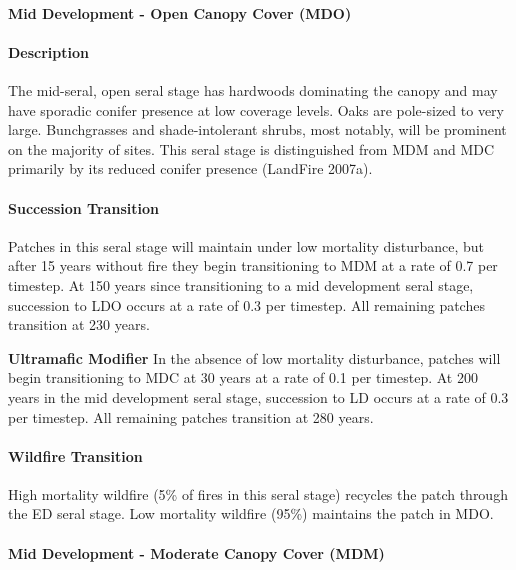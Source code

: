 \noindent\hrulefill


\paragraph*{Mid Development - Open Canopy Cover (MDO)}

\paragraph*{Description} The mid-seral, open seral stage has hardwoods dominating the canopy and may have sporadic conifer presence at low coverage levels. Oaks are pole-sized to very large. Bunchgrasses and shade-intolerant shrubs, most notably, will be prominent on the majority of sites. This seral stage is distinguished from MDM and MDC primarily by its reduced conifer presence (LandFire 2007a).

\paragraph*{Succession Transition} Patches in this seral stage will maintain under low mortality disturbance, but after 15 years without fire they begin transitioning to MDM at a rate of 0.7 per timestep. At 150 years since transitioning to a mid development seral stage, succession to LDO occurs at a rate of 0.3 per timestep. All remaining patches transition at 230 years. 
\begin{adjustwidth}{2cm}{}
\medskip

\textbf{Ultramafic Modifier}  In the absence of low mortality disturbance, patches will begin transitioning to MDC at 30 years at a rate of 0.1 per timestep. At 200 years in the mid development seral stage, succession to LD occurs at a rate of 0.3 per timestep. All remaining patches transition at 280 years.

\end{adjustwidth}
\paragraph*{Wildfire Transition}
High mortality wildfire (5\% of fires in this seral stage) recycles the patch through the ED seral stage. Low mortality wildfire (95\%) maintains the patch in MDO.

\noindent\hrulefill

\paragraph*{Mid Development - Moderate Canopy Cover (MDM)}

